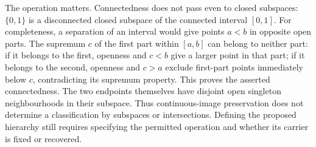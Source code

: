 The operation matters. Connectedness does not pass even to closed
subspaces: $\{0,1\}$ is a disconnected closed subspace of the connected
interval $[0,1]$. For completeness, a separation of an interval would
give points $a<b$ in opposite open parts. The supremum $c$ of the first
part within $[a,b]$ can belong to neither part: if it belongs to the
first, openness and $c<b$ give a larger point in that part; if it belongs
to the second, openness and $c>a$ exclude first-part points immediately
below $c$, contradicting its supremum property. This proves the asserted
connectedness. The two endpoints themselves have disjoint open singleton
neighbourhoods in their subspace. Thus continuous-image preservation does
not determine a classification by subspaces or intersections. Defining
the proposed hierarchy still requires specifying the permitted operation
and whether its carrier is fixed or recovered.

\iftrue
\pagebreak
